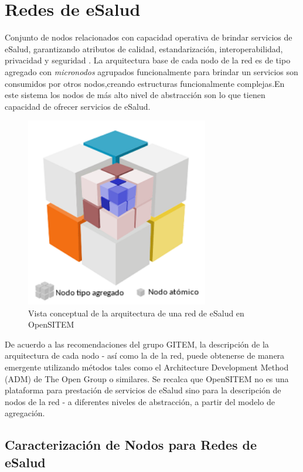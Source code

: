 \section{Redes de eSalud}

Conjunto de nodos relacionados con capacidad operativa de brindar servicios de eSalud, garantizando atributos de calidad, estandarización, interoperabilidad, privacidad y seguridad \cite{wilson2017}. La arquitectura base de cada nodo de la red es de tipo agregado con \textit{micronodos} agrupados funcionalmente para brindar un servicios son consumidos por otros nodos,creando estructuras funcionalmente complejas.En este sistema los nodos de más alto nivel de abstracción son lo que tienen capacidad de ofrecer servicios de eSalud.

\begin{figure}
 \centering
 \includegraphics[width=80mm, height=83mm]{concepto_red_esalud.png}
 \caption{Vista conceptual de la arquitectura de una red de eSalud en OpenSITEM}
 \label{elementosred}
\end{figure}

De acuerdo a las recomendaciones del grupo GITEM, la descripción de la arquitectura de cada nodo - así como la de la red, puede obtenerse de manera emergente utilizando métodos tales como el Architecture Development Method (ADM) de The Open Group o similares. Se recalca que OpenSITEM no es una plataforma para prestación de servicios de eSalud sino para la descripción de nodos de la red - a diferentes niveles de abstracción, a partir del modelo de agregación. 

\subsection{Caracterización de Nodos para Redes de eSalud}

